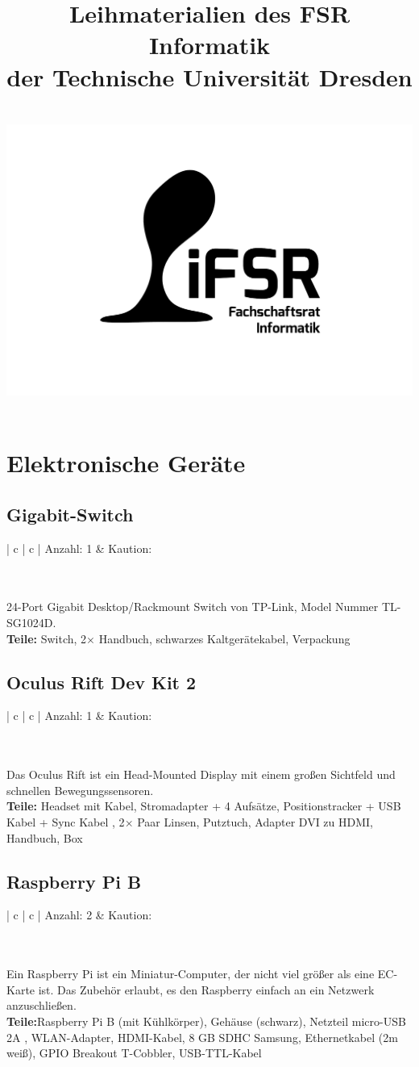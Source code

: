 \documentclass[a4paper]{article}
\newcommand{\iFSR}{FSR Informatik}
\newcommand{\infobox}[3] %
        {\par
        		{\tabulinesep=1.2mm
                \begin{tabu}{| c | c |}
                \hline
                Anzahl: #1 & Kaution: \EUR{#3}   \\
                \hline
                \end{tabu}} \\ \\
        }
\begin{document}
\title{\bf Leihmaterialien des \iFSR \\
        der Technische Universität Dresden \\~\\
         \includegraphics[width=.3\textwidth]{fsrlogo}
}

\maketitle


\tableofcontents


\pagebreak

\section{Elektronische Geräte}

\subsection{Gigabit-Switch}
\infobox{1}{1}{0}
24-Port Gigabit Desktop/Rackmount Switch von TP-Link, Model Nummer TL-SG1024D. \\
\textbf{ Teile:} Switch, 2$\times$ Handbuch, schwarzes Kaltgerätekabel, Verpackung

\subsection{Oculus Rift Dev Kit 2}
\infobox{1}{30}{20}
Das Oculus Rift ist ein Head-Mounted Display mit einem großen Sichtfeld und schnellen Bewegungssensoren. \\
\textbf{Teile:} Headset mit Kabel, Stromadapter + 4 Aufsätze, Positionstracker + USB Kabel + Sync Kabel , 2$\times$ Paar Linsen, Putztuch, Adapter DVI zu HDMI, Handbuch, Box

\subsection{Raspberry Pi B}
\infobox{2}{1}{0}
Ein Raspberry Pi ist ein Miniatur-Computer, der nicht viel größer als eine EC-Karte ist. Das Zubehör erlaubt, es den Raspberry einfach an ein Netzwerk anzuschließen. \\
\textbf{Teile:}Raspberry Pi B (mit Kühlkörper), Gehäuse (schwarz), Netzteil micro-USB 2A , WLAN-Adapter, HDMI-Kabel, 8 GB SDHC Samsung, Ethernetkabel (2m weiß), GPIO Breakout T-Cobbler, USB-TTL-Kabel 
\end{document}
